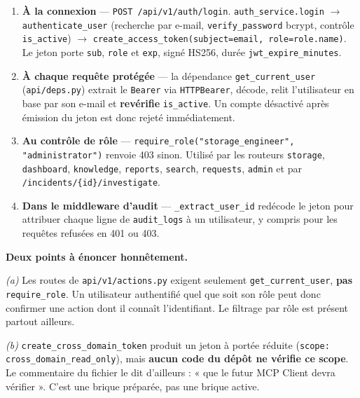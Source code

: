 \documentclass[11pt,a4paper]{report}
\newcommand{\file}[1]{\texttt{\small #1}}
\newcommand{\fn}[1]{\texttt{\small\textcolor{oasisviolet}{#1}}}
\newcommand{\tbl}[1]{\texttt{\small\textcolor{oasisamber}{#1}}}
\newcommand{\route}[1]{\texttt{\small\textcolor{oasisgreen}{#1}}}
\newcommand{\arrowto}{\ensuremath{\rightarrow}}
\begin{document}
\begin{enumerate}
  \item \textbf{À la connexion} --- \route{POST /api/v1/auth/login}.
  \fn{auth\_service.login} \arrowto{} \fn{authenticate\_user} (recherche par
  e-mail, \fn{verify\_password} bcrypt, contrôle \texttt{is\_active}) \arrowto{}
  \fn{create\_access\_token(subject=email, role=role.name)}. Le jeton porte
  \texttt{sub}, \texttt{role} et \texttt{exp}, signé HS256, durée
  \texttt{jwt\_expire\_minutes}.

  \item \textbf{À chaque requête protégée} --- la dépendance
  \fn{get\_current\_user} (\file{api/deps.py}) extrait le \texttt{Bearer} via
  \texttt{HTTPBearer}, décode, relit l'utilisateur en base par son e-mail et
  \textbf{revérifie} \texttt{is\_active}. Un compte désactivé après émission du
  jeton est donc rejeté immédiatement.

  \item \textbf{Au contrôle de rôle} --- \fn{require\_role("storage\_engineer",
  "administrator")} renvoie 403 sinon. Utilisé par les routeurs
  \texttt{storage}, \texttt{dashboard}, \texttt{knowledge}, \texttt{reports},
  \texttt{search}, \texttt{requests}, \texttt{admin} et par
  \route{/incidents/\{id\}/investigate}.

  \item \textbf{Dans le middleware d'audit} --- \fn{\_extract\_user\_id} redécode
  le jeton pour attribuer chaque ligne de \tbl{audit\_logs} à un utilisateur,
  y compris pour les requêtes refusées en 401 ou 403.
\end{enumerate}

\begin{warnbox}
\textbf{Deux points à énoncer honnêtement.}

\emph{(a)} Les routes de \file{api/v1/actions.py} exigent seulement
\fn{get\_current\_user}, \textbf{pas} \fn{require\_role}. Un utilisateur
authentifié quel que soit son rôle peut donc confirmer une action dont il
connaît l'identifiant. Le filtrage par rôle est présent partout ailleurs.

\emph{(b)} \fn{create\_cross\_domain\_token} produit un jeton à portée réduite
(\texttt{scope: cross\_domain\_read\_only}), mais \textbf{aucun code du dépôt ne
vérifie ce scope}. Le commentaire du fichier le dit d'ailleurs : « que le futur
MCP Client devra vérifier ». C'est une brique préparée, pas une brique active.
\end{warnbox}

\end{document}
